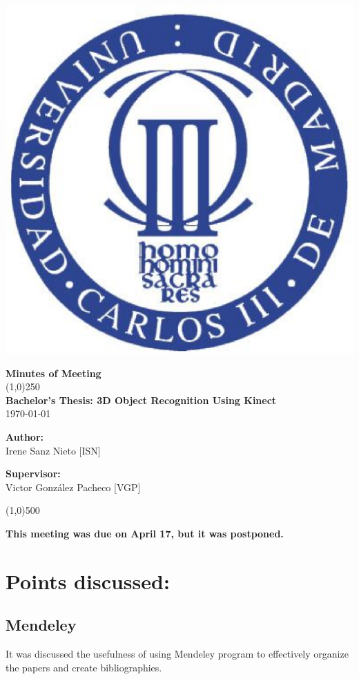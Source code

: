 \documentclass{article}
\newenvironment{myindentpar}[1]%
 {\begin{list}{}%
         {\setlength{\leftmargin}{#1}}%
         \item[]%
 }
 {\end{list}}
\begin{document}
\includegraphics[width=0.1\linewidth]{../template/uc3m.eps}

\vspace{-1cm}
\begin{minipage}[b]{1\linewidth}
	\begin{center}
	{\Huge \bfseries{Minutes of Meeting}}\\
	\line(1,0){250}\\[1cm]
	{\LARGE \textbf{Bachelor's Thesis: 3D Object Recognition Using Kinect}}\\[0.5cm]
	{\large \today}
	\end{center}
\end {minipage}



\begin{minipage}{0.55\textwidth}
\begin{flushleft} \large
\textbf{{Author:}\\}
Irene Sanz Nieto [ISN]\\
\end{flushleft}
\end{minipage}
\begin{minipage}{0.4\textwidth}
\begin{flushright} \large
\textbf{Supervisor: }\\
Victor González Pacheco [VGP]
\end{flushright}\end{minipage}

\begin{center}
\line(1,0){500}
\end{center}

\renewcommand{\thesubsection}
{\hspace*{1cm} \arabic{section}.\arabic{subsection}}

\begin {center}
{\Large \textbf{This meeting was due on April 17, but it was postponed. }}
\end{center}


\section{\LARGE Points discussed: }
	
	\subsection{Mendeley}
		\begin{myindentpar}{1cm} 
		It was discussed the usefulness of using Mendeley program to effectively organize the papers and create bibliographies.
		\end{myindentpar}
\end{document}
